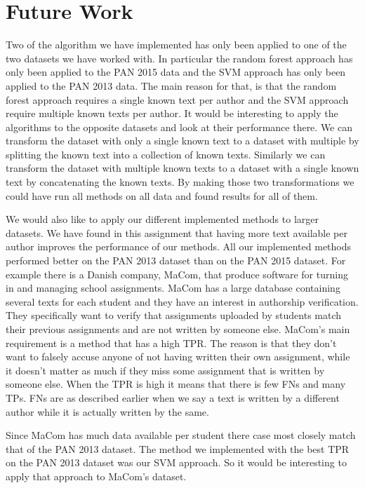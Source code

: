 \section{Future Work} \label{sec:future_work}

Two of the algorithm we have implemented has only been applied to one of the
two datasets we have worked with. In particular the random forest approach has
only been applied to the PAN 2015 data and the \gls{SVM} approach has only been
applied to the PAN 2013 data. The main reason for that, is that the random
forest approach requires a single known text per author and the \gls{SVM}
approach require multiple known texts per author. It would be interesting to
apply the algorithms to the opposite datasets and look at their performance
there. We can transform the dataset with only a single known text to a dataset
with multiple by splitting the known text into a collection of known texts.
Similarly we can transform the dataset with multiple known texts to a dataset
with a single known text by concatenating the known texts. By making those two
transformations we could have run all methods on all data and found results for
all of them.

We would also like to apply our different implemented methods to larger
datasets. We have found in this assignment that having more text available per
author improves the performance of our methods. All our implemented methods
performed better on the PAN 2013 dataset than on the PAN 2015 dataset. For
example there is a Danish company, MaCom, that produce software for turning in
and managing school assignments. MaCom has a large database containing several
texts for each student and they have an interest in authorship verification.
They specifically want to verify that assignments uploaded by students match
their previous assignments and are not written by someone else. MaCom's main
requirement is a method that has a high \gls{TPR}. The reason is that they
don't want to falsely accuse anyone of not having written their own assignment,
while it doesn't matter as much if they miss some assignment that is written by
someone else. When the \gls{TPR} is high it means that there is few \gls{FN}s
and many \gls{TP}s. \gls{FN}s are as described earlier when we say a text is
written by a different author while it is actually written by the same.

Since MaCom has much data available per student there case most closely match
that of the PAN 2013 dataset. The method we implemented with the best \gls{TPR}
on the PAN 2013 dataset was our \gls{SVM} approach. So it would be interesting
to apply that approach to MaCom's dataset.
